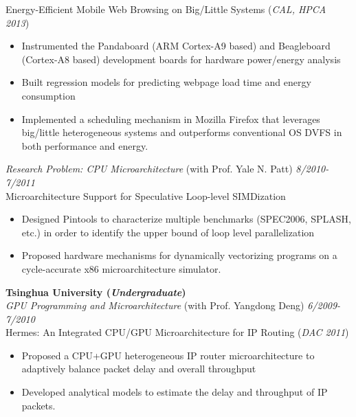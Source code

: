 \documentclass[margin, 9pt]{res} %
\begin{document}
\begin{resume}
\medskip
Energy-Efficient Mobile Web Browsing on Big/Little Systems \hfill(\textit{CAL, HPCA 2013})\\
\vspace*{-10pt}
\begin{itemize}[leftmargin=*] \itemsep -3pt
\vspace*{-5pt}
	\item Instrumented the Pandaboard (ARM Cortex-A9 based) and Beagleboard (Cortex-A8 based) development boards for hardware power/energy analysis
	\item Built regression models for predicting webpage load time and energy consumption
	\item Implemented a scheduling mechanism in Mozilla Firefox that leverages big/little heterogeneous systems and outperforms conventional OS DVFS in both performance and energy.
\end{itemize}

\medskip
{\large\textit{Research Problem: CPU Microarchitecture} (with Prof. Yale N. Patt)} \hfill\textit{8/2010-7/2011}\\

\vspace*{-7pt}
Microarchitecture Support for Speculative Loop-level SIMDization\\
\vspace*{-10pt}
\begin{itemize}[leftmargin=*] \itemsep -3pt
\vspace*{-5pt}
	\item Designed Pintools to characterize multiple benchmarks (SPEC2006, SPLASH, etc.) in order to identify the upper bound of loop level parallelization
	\item Proposed hardware mechanisms for dynamically vectorizing programs on a cycle-accurate x86 microarchitecture simulator.
\end{itemize}

\bigskip
{\large\textbf{Tsinghua University (\textit{Undergraduate})}}\\

\vspace*{-7pt}
{\large\textit{GPU Programming and Microarchitecture} (with Prof. Yangdong Deng)} \hfill\textit{6/2009-7/2010}\\

\vspace*{-7pt}
Hermes: An Integrated CPU/GPU Microarchitecture for IP Routing \hfill(\textit{DAC 2011})\\
\vspace*{-10pt}
\begin{itemize}[leftmargin=*] \itemsep -3pt
\vspace*{-5pt}
	\item Proposed a CPU+GPU heterogeneous IP router microarchitecture to adaptively balance packet delay and overall throughput
	\item Developed analytical models to estimate the delay and throughput of IP packets.
\end{itemize}


\end{resume}
\end{document}

